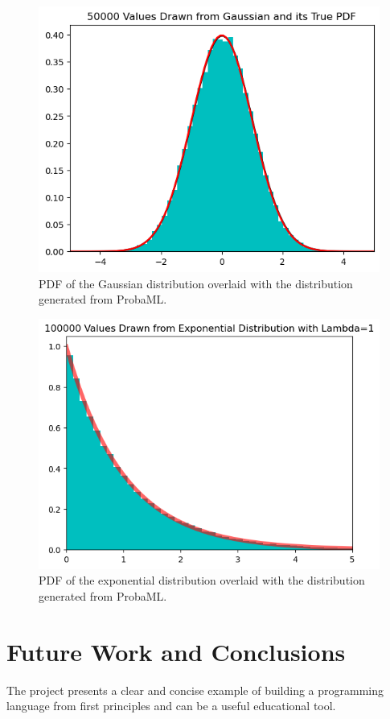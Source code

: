 \documentclass[pageno]{jpaper}
\begin{document}
\begin{figure}[hbt]
  \centering
  \includegraphics[scale=0.8]{gaussian.png}
  \caption{PDF of the Gaussian distribution overlaid with the distribution generated from ProbaML.}
  \label{fig:gaussian_graph}
\end{figure}

\begin{figure}[hbt]
  \centering
  \includegraphics[scale=0.8]{exponential.png}
  \caption{PDF of the exponential distribution overlaid with the distribution generated from ProbaML.}
  \label{fig:expon_graph}
\end{figure}

\section{Future Work and Conclusions}
The project presents a clear and concise example of building a programming language from first principles and can be a useful educational tool.
\end{document}
